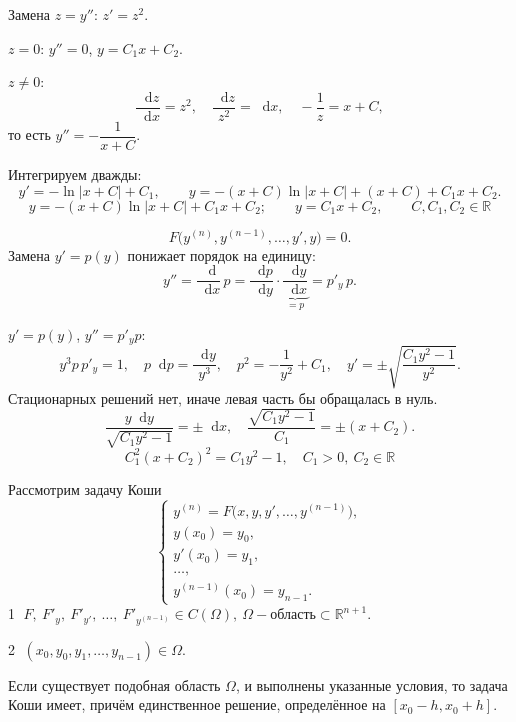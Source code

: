 \documentclass[12pt,a4paper]{article}
\numberwithin{equation}{section}
\newcommand{\R}{\mathbb{R}}
\newcommand{\dd}{\mathop{}\!\mathrm{d}}
\begin{document}
\begin{exampleHSE}[\(y'''=y''^2\)]
Замена $z=y''$: $z'=z^2$.

$z=0$: $y''=0$, $y=C_1x+C_2$.

$z\neq0$:
\[\frac{\dd z}{\dd x}=z^2,\quad\frac{\dd z}{z^2}=\dd x,\quad-\frac1z=x+C,\]
то есть $y''=-\dfrac{1}{x+C}$.

Интегрируем дважды:
\[
y'=-\ln|x+C|+C_1,\qquad y=-(x+C)\ln|x+C|+(x+C)+C_1x+C_2.
\]
\[
\boxed{\ y=-(x+C)\ln|x+C|+C_1x+C_2;\qquad y=C_1x+C_2,\qquad C,C_1,C_2\in\R\ }
\]
\end{exampleHSE}

\label{box:type16}
\begin{definitionHSE}
\[
F\bigl(y^{(n)},y^{(n-1)},\ldots,y',y\bigr)=0.
\]
Замена $y'=p(y)$ понижает порядок на единицу:
\[
y''=\frac{\dd}{\dd x}\,p=\frac{\dd p}{\dd y}\cdot\underbrace{\frac{\dd y}{\dd x}}_{=p}=p'_y\,p.
\]
\end{definitionHSE}

\begin{exampleHSE}[\(y^3y''=1\)]
$y'=p(y)$, $y''=p'_yp$:
\[
y^3p\,p'_y=1,\quad p\dd p=\frac{\dd y}{y^3},\quad p^2=-\frac{1}{y^2}+C_1,\quad
y'=\pm\sqrt{\frac{C_1y^2-1}{y^2}}.
\]
Стационарных решений нет, иначе левая часть бы обращалась в нуль.
\[
\frac{y\dd y}{\sqrt{C_1y^2-1}}=\pm\dd x,\quad \frac{\sqrt{C_1y^2-1}}{C_1}=\pm(x+C_2).
\]
\[
\boxed{\ C_1^2(x+C_2)^2=C_1y^2-1,\quad C_1>0,\ C_2\in\R\ }
\]
\end{exampleHSE}

\label{box:thm-n}
\begin{theoremHSE}
Рассмотрим задачу Коши
\[
\begin{cases}
y^{(n)}=F\bigl(x,y,y',\ldots,y^{(n-1)}\bigr),\\
y(x_0)=y_0,\\
y'(x_0)=y_1,\\
\ldots,\\
y^{(n-1)}(x_0)=y_{n-1}.
\end{cases}
\]
\textcircled{\small 1} \(F,\ F'_y,\ F'_{y'},\ \ldots,\ F'_{y^{(n-1)}}\in C(\Omega),\ \Omega-\text{область}\subset\R^{n+1}.\)

\textcircled{\small 2} \((x_0,y_0,y_1,\ldots,y_{n-1})\in\Omega.\)

Если существует подобная область $\Omega$, и выполнены указанные условия, то задача Коши имеет, причём единственное решение, определённое на \([x_0-h,x_0+h]\).
\end{theoremHSE}
\end{document}
